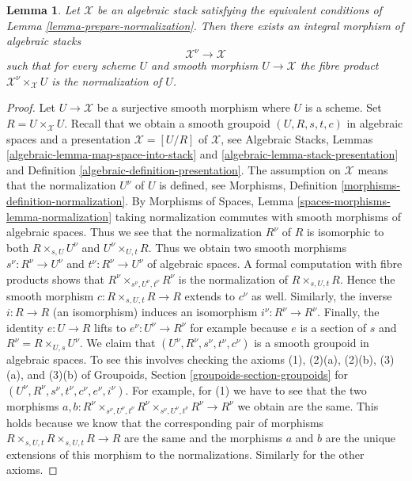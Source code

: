 \documentclass{stacks-project}
\theoremstyle{plain}
\newtheorem{lemma}[subsection]{Lemma}
\theoremstyle{definition}
\theoremstyle{remark}
\numberwithin{equation}{subsection}
\begin{document}
\begin{lemma}
\label{lemma-normalization}
Let $\mathcal{X}$ be an algebraic stack satisfying
the equivalent conditions of Lemma \ref{lemma-prepare-normalization}.
Then there exists an integral morphism of algebraic stacks
$$
\mathcal{X}^\nu \longrightarrow \mathcal{X}
$$
such that for every scheme $U$ and smooth morphism $U \to \mathcal{X}$
the fibre product $\mathcal{X}^\nu \times_\mathcal{X} U$
is the normalization of $U$.
\end{lemma}

\begin{proof}
Let $U \to \mathcal{X}$ be a surjective smooth morphism where $U$ is a scheme.
Set $R = U \times_\mathcal{X} U$. Recall that we obtain a smooth groupoid
$(U, R, s, t, c)$ in algebraic spaces and a presentation
$\mathcal{X} = [U/R]$ of $\mathcal{X}$, see Algebraic Stacks,
Lemmas \ref{algebraic-lemma-map-space-into-stack} and
\ref{algebraic-lemma-stack-presentation} and
Definition \ref{algebraic-definition-presentation}.
The assumption on $\mathcal{X}$ means that the normalization
$U^\nu$ of $U$ is defined, see Morphisms, Definition
\ref{morphisms-definition-normalization}.
By Morphisms of Spaces, Lemma
\ref{spaces-morphisms-lemma-normalization}
taking normalization commutes with smooth morphisms of algebraic spaces.
Thus we see that the normalization $R^\nu$ of $R$
is isomorphic to both $R \times_{s, U} U^\nu$ and $U^\nu \times_{U, t} R$.
Thus we obtain two smooth morphisms
$s^\nu : R^\nu \to U^\nu$ and $t^\nu : R^\nu \to U^\nu$
of algebraic spaces. A formal computation with fibre products shows that
$R^\nu \times_{s^\nu, U^\nu, t^\nu} R^\nu$ is the normalization
of $R \times_{s, U, t} R$. Hence the smooth morphism
$c : R \times_{s, U, t} R \to R$ extends to $c^\nu$ as well.
Similarly, the inverse $i : R \to R$ (an isomorphism) induces
an isomorphism $i^\nu : R^\nu \to R^\nu$. Finally, the identity
$e : U \to R$ lifts to $e^\nu : U^\nu \to R^\nu$ for example
because $e$ is a section of $s$ and $R^\nu = R \times_{U, s} U^\nu$.
We claim that $(U^\nu, R^\nu, s^\nu, t^\nu, c^\nu)$ is
a smooth groupoid in algebraic spaces. To see this involves checking
the axioms (1), (2)(a), (2)(b), (3)(a), and (3)(b) of
Groupoids, Section \ref{groupoids-section-groupoids}
for $(U^\nu, R^\nu, s^\nu, t^\nu, c^\nu, e^\nu, i^\nu)$.
For example, for (1) we have to see that the two morphisms
$a, b : R^\nu \times_{s^\nu, U^\nu, t^\nu} R^\nu
\times_{s^\nu, U^\nu, t^\nu} R^\nu \to R^\nu$ we obtain are the same.
This holds because we know that the corresponding pair of morphisms
$R \times_{s, U, t} R \times_{s, U, t} R \to R$
are the same and the morphisms $a$ and $b$ are the unique extensions
of this morphism to the normalizations. Similarly for the other
axioms.


\end{proof}
\end{document}
